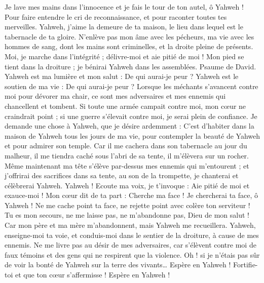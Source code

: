 \begin{multicols}{2}
Je lave mes mains dans l'innocence et je fais le tour de ton autel, ô Yahweh !
Pour faire entendre le cri de reconnaissance, et pour raconter toutes tes merveilles.
Yahweh, j'aime la demeure de ta maison, le lieu dans lequel est le tabernacle de ta gloire.
N'enlève pas mon âme avec les pécheurs, ma vie avec les hommes de sang,
dont les mains sont criminelles, et la droite pleine de présents.
Moi, je marche dans l'intégrité ; délivre-moi et aie pitié de moi !
Mon pied se tient dans la droiture ; je bénirai Yahweh dans les assemblées.
\VerseOne{}Psaume de David. Yahweh est ma lumière et mon salut : De qui aurai-je peur ? Yahweh est le soutien de ma vie : De qui aurai-je peur ?
Lorsque les méchants s'avancent contre moi pour dévorer ma chair, ce sont mes adversaires et mes ennemis qui chancellent et tombent.
Si toute une armée campait contre moi, mon cœur ne craindrait point ; si une guerre s'élevait contre moi, je serai plein de confiance.
Je demande une chose à Yahweh, que je désire ardemment : C'est d'habiter dans la maison de Yahweh tous les jours de ma vie, pour contempler la beauté de Yahweh et pour admirer son temple.
Car il me cachera dans son tabernacle au jour du malheur, il me tiendra caché sous l'abri de sa tente, il m'élèvera sur un rocher.
Même maintenant ma tête s'élève par-dessus mes ennemis qui m'entourent ; et j'offrirai des sacrifices dans sa tente, au son de la trompette, je chanterai et célèbrerai Yahweh.
Yahweh ! Ecoute ma voix, je t'invoque : Aie pitié de moi et exauce-moi !
Mon cœur dit de ta part : Cherche ma face ! Je chercherai ta face, ô Yahweh !
Ne me cache point ta face, ne rejette point avec colère ton serviteur ! Tu es mon secours, ne me laisse pas, ne m'abandonne pas, Dieu de mon salut !
Car mon père et ma mère m'abandonnent, mais Yahweh me recueillera.
Yahweh, enseigne-moi ta voie, et conduis-moi dans le sentier de la droiture, à cause de mes ennemis.
Ne me livre pas au désir de mes adversaires, car s'élèvent contre moi de faux témoins et des gens qui ne respirent que la violence.
Oh ! si je n'étais pas sûr de voir la bonté de Yahweh sur la terre des vivants…
Espère en Yahweh ! Fortifie-toi et que ton cœur s'affermisse ! Espère en Yahweh !

\end{multicols}
